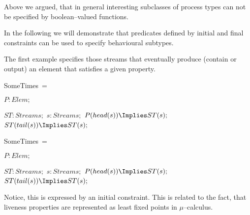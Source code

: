 \documentclass[landscape, autoslides, light]{mmiss}
\newcommand{\vsp}{\pause\vspace{8mm}}
\begin{document}
\begin{Package}[Label={FSDPT}, Title={Formal Specification of Data and Process Types}, ShortTitle={FSDPT}, Authors={Horst Reichel}, Date={February 2003}, LevelOfDetail=Lecture, Language=en-GB]
\begin{Section}[Title={Final Coalgebras as Process Types}, Label={section4}]
\begin{Section}[Title={Coinduction}, Label={section4_3}]
\begin{Paragraph}[Title={Coinductive Proofs}, Label=Paragraph128]
\end{Paragraph}
\end{Section}
 \begin{Section}[Title={Behavioural Subtypes}, Label={section4_4}]
\begin{Paragraph}

Above we argued, that in general interesting subclasses of process
types can not be specified by boolean--valued functions.\vsp

In the following we will demonstrate that predicates defined by
initial and final constraints can be used to specify behavioural
subtypes.\vsp

The first example specifies those streams that eventually produce
(contain or output) an element that satisfies a given property.

\end{Paragraph}
\begin{Paragraph}[Title={sometimes}, Label=Paragraph129]

\begin{SpecDefn}{SomeTimes}~= 
 \item[\Then]
\I\Pred \( P : Elem; \) \item[\Free~\Group]
\begin{Items}
\I\Pred \( ST : Streams;\) \I\Vars \( s : Streams; \) \I\Axioms \(
P(head(s)) \Implies ST(s);\)
\\ \(ST(tail(s)) \Implies ST(s);\)
  ~\EndGroup \end{Items} \item[\End]
\end{SpecDefn}

\end{Paragraph}
\begin{Paragraph}[Title={sometimes}, Label=Paragraph130]

\begin{SpecDefn}{SomeTimes}~= 
 \item[\Then]
\I\Pred \( P : Elem; \) \item[\Free~\Group]
\begin{Items}
\I\Pred \( ST : Streams;\) \I\Vars \( s : Streams; \) \I\Axioms \(
P(head(s)) \Implies ST(s);\)
\\ \(ST(tail(s)) \Implies ST(s);\)
  ~\EndGroup \end{Items} \item[\End]
\end{SpecDefn}

Notice,  this  is expressed by an
initial constraint. This is related to the fact, that liveness
properties are represented as least fixed points in
$\mu$--calculus.


\end{Paragraph}
\end{Section}
\end{Section}
\end{Package}
\end{document}
